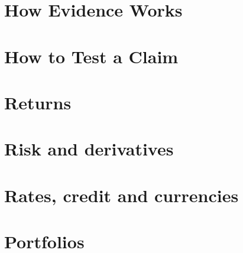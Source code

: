 \documentclass[12pt]{Beautybook-EN}
\begin{document}




\part{How Evidence Works}

\part{How to Test a Claim}  

  


   
   

\part{Returns}
  
   
   
  

\part{Risk and derivatives}

\part{Rates, credit and currencies}

\part{Portfolios}
\end{document}
